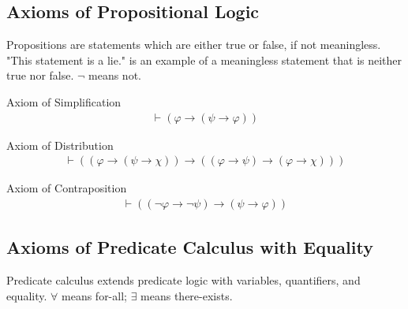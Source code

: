 \subsection{Axioms of Propositional Logic}\label{sec:proplogic}

\pn Propositions are statements which are either true or false, if not meaningless.  "This statement is a lie." is an example of a meaningless statement that is neither true nor false. $\lnot$ means not.

\begin{axiom}\label{axi:ax-1} Axiom of Simplification 
\begin{align}
\vdash ( \varphi \rightarrow ( \psi \rightarrow \varphi )
    )\label{eq:ax-1}\tag{ax-1}
\end{align}
\end{axiom}
\begin{axiom}\label{axi:ax-2} Axiom of Distribution 
\begin{align}
\vdash ( ( \varphi \rightarrow ( \psi \rightarrow \chi ) ) \rightarrow ( (
    \varphi \rightarrow \psi ) \rightarrow ( \varphi \rightarrow \chi ) )
    )\label{eq:ax-2}\tag{ax-2}
\end{align}
\end{axiom}
\begin{axiom}\label{axi:ax-3} Axiom of Contraposition   
\begin{align}
\vdash ( ( \lnot \varphi \rightarrow \lnot \psi ) \rightarrow ( \psi
    \rightarrow \varphi ) )\label{eq:ax-3}\tag{ax-3}
\end{align}
\end{axiom}

\subsection{Axioms of Predicate Calculus with Equality}

\pn Predicate calculus extends predicate logic with variables, quantifiers, and equality.  $\forall$ means for-all;
$\exists$ means there-exists. 

